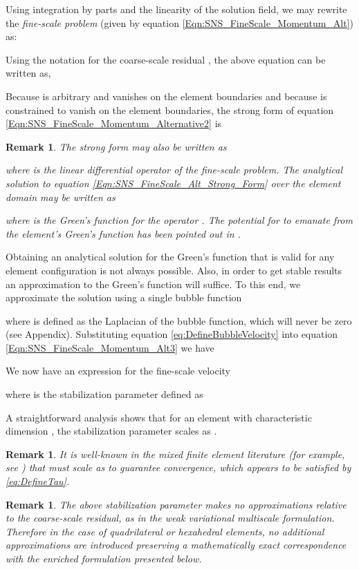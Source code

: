 \documentclass[11pt]{amsart}
\newtheorem{remark}[theorem]{Remark}
\begin{document}
Using integration by parts and the linearity of the solution field, we may rewrite the \emph{fine-scale problem} (given by equation \eqref{Eqn:SNS_FineScale_Momentum_Alt}) as:

Using the notation for the coarse-scale residual , the above equation can be written as,

Because  is arbitrary and vanishes on the element boundaries and because  is constrained to vanish on the element boundaries, the strong form of equation \eqref{Eqn:SNS_FineScale_Momentum_Alternative2} is

\begin{remark}
The strong form may also be written as 

where  is the linear differential operator of the \emph{fine-scale problem}.  The analytical solution to equation \eqref{Eqn:SNS_FineScale_Alt_Strong_Form} over the element domain may be written as
 
 where  is the Green's function for the operator .  The potential for  to emanate from the element's Green's function has been pointed out in \cite{Hughes2}.
\end{remark}
Obtaining an analytical solution for the Green's function that is valid for any element configuration is not always possible.  Also, in order to get stable results an approximation to the Green's function will suffice.  To this end, we approximate the solution using a single bubble function

where  is defined as the Laplacian of the bubble function, which will never be zero (see Appendix).  Substituting equation \eqref{eq:DefineBubbleVelocity} into equation \eqref{Eqn:SNS_FineScale_Momentum_Alt3} we have

We now have an expression for the fine-scale velocity 

where  is the stabilization parameter defined as

A straightforward analysis shows that for an element with characteristic dimension , the stabilization parameter  scales as .
\begin{remark}
It is well-known in the mixed finite element literature (for example, see \cite{Douglas,PSPG}) that  must scale as  to guarantee convergence, which appears to be satisfied by \eqref{eq:DefineTau}.
\end{remark}
\begin{remark}
The above stabilization parameter makes no approximations relative to the coarse-scale residual, as in the weak variational multiscale formulation.  Therefore in the case of quadrilateral or hexahedral elements, no additional approximations are introduced preserving a mathematically exact correspondence with the enriched formulation presented below.
\end{remark}
\end{document}
